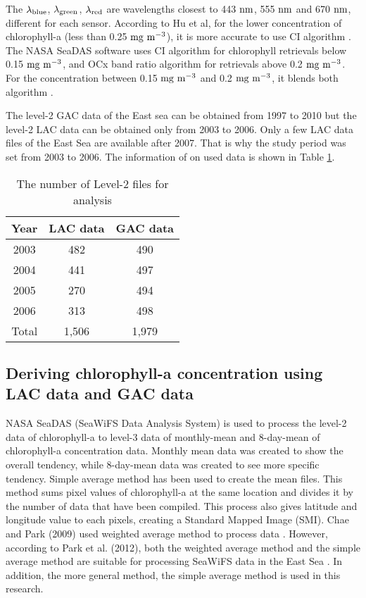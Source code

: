 The $\rm {\lambda}_{blue}$, $\rm {\lambda}_{green}$, $\rm {\lambda}_{red}$ are wavelengths closest to 443 $\rm nm$, 555 $\rm nm$ and 670 $\rm nm$, different for each sensor. According to Hu et al, for the lower concentration of chlorophyll-a (less than 0.25 $\rm mg~m^{-3}$), it is more accurate to use CI algorithm \cite{hu2012chlorophyll}. The NASA SeaDAS software uses CI algorithm for chlorophyll retrievals below 0.15 $\rm mg~m^{-3}$, and OCx band ratio algorithm for retrievals above 0.2 $\rm mg~m^{-3}$. For the concentration between 0.15 $\rm mg~m^{-3}$ and 0.2 $\rm mg~m^{-3}$, it blends both algorithm \cite{NASASeaFiWSdata}.


The level-2 GAC data of the East sea can be obtained from 1997 to 2010 but the level-2 LAC data can be obtained only from 2003 to 2006. Only a few LAC data files of the East Sea are available after 2007. That is why the study period was set from 2003 to 2006. The information of on used data is shown in Table \ref{data_information}.


 \begin{table}[h]
	\centering
	\caption{The number of Level-2 files for analysis}
	\label{data_information}
	\begin{tabular}{c  c  c  }
		\toprule
		Year & LAC data  & GAC data \\ %
		\midrule
		2003 & 482 & 490 \\ %
		2004 & 441 & 497 \\ %
		2005 & 270 & 494 \\ %
		2006 & 313 & 498 \\ %
			\midrule
		Total & 1,506 & 1,979 \\ %
		\bottomrule
	\end{tabular}
\end{table}




\hfill \break


 \subsection{Deriving chlorophyll-a concentration using LAC data and GAC data}
 
NASA SeaDAS (SeaWiFS Data Analysis System) is used to process the level-2 data of chlorophyll-a to level-3 data of monthly-mean and 8-day-mean of chlorophyll-a concentration data. Monthly mean data was created to show the overall tendency, while 8-day-mean data was created to see more specific tendency. Simple average method has been used to create the mean files. This method sums pixel values of chlorophyll-a at the same location and divides it by the number of data that have been compiled. This process also gives latitude and longitude value to each pixels, creating a Standard Mapped Image (SMI). Chae and Park (2009) used weighted average method to process data \cite{chae2009characteristics}. However, according to Park et al. (2012), both the weighted average method and the simple average method are suitable for processing SeaWiFS data in the East Sea \cite{park2012comparison}. In addition, the more general method, the simple average method is used in this research.

